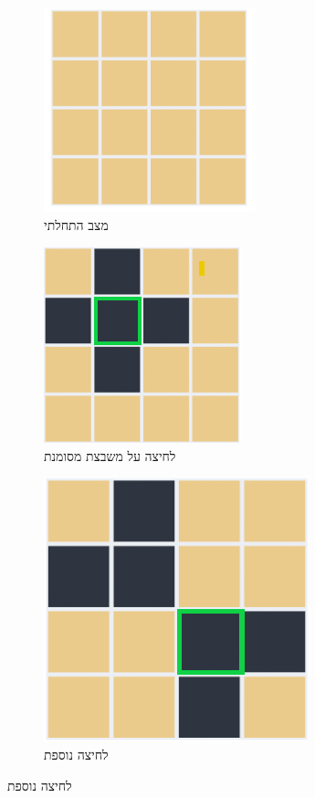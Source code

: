 \documentclass[12pt,twoside]{article}
\begin{document}
\begin{figure}[ht]
    \caption{הסבר מהלך משחק על לוח}
    \centering
    \label{fig: explain game}
    \begin{subfigure}{.3\textwidth}
        \caption{מצב התחלתי}
        \label{subfig: explain game, start}
        \centering
        \includegraphics[scale=0.67]{images/4x4_start_board.PNG}
    \end{subfigure}%
    \begin{subfigure}{.3\textwidth}
        \caption{לחיצה על משבצת מסומנת}
        \label{subfig: explain game, move}
        \centering
        \includegraphics[scale=0.67]{images/4x4_press.PNG}
    \end{subfigure}%
    \begin{subfigure}{.3\textwidth}
        \caption{לחיצה נוספת}
        \label{subfig: explain game, next move}
        \centering
        \includegraphics[scale=0.49]{images/4x4_next_press.PNG}
    \end{subfigure}%
\end{figure}
\end{document}
